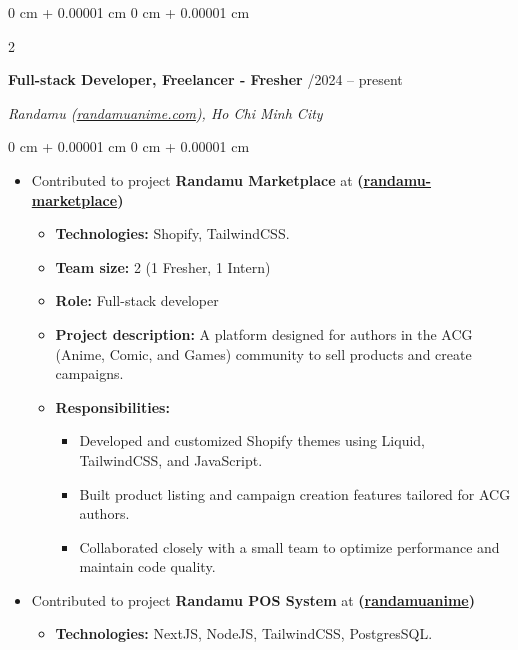 \documentclass[10pt, letterpaper]{article}
\newenvironment{highlights}{
    \begin{itemize}[
        topsep=0.10 cm,
        parsep=0.10 cm,
        partopsep=0pt,
        itemsep=0pt,
        leftmargin=0 cm + 10pt
    ]
}{
    \end{itemize}
} %
\newenvironment{onecolentry}{
    \begin{adjustwidth}{
        0 cm + 0.00001 cm
    }{
        0 cm + 0.00001 cm
    }
}{
    \end{adjustwidth}
} %
\newenvironment{twocolentry}[2][]{
    \onecolentry
    \def\secondColumn{#2}
    \setcolumnwidth{\fill, 4.5 cm}
    \begin{paracol}{2}
}{
    \switchcolumn \raggedleft \secondColumn
    \end{paracol}
    \endonecolentry
} %
\begin{document}
        \begin{twocolentry}{
            11/2024 – present
        }
            \textbf{Full-stack Developer, Freelancer - Fresher}\end{twocolentry}
        \vspace{0.10 cm}
        \par{\textit{Randamu (\href{https://randamuanime.com/en}{randamuanime.com}), Ho Chi Minh City}}
        \vspace{0.10 cm}
        \begin{onecolentry}
            \begin{highlights}
                \item Contributed to project {\bf Randamu Marketplace} at 
                {\bf (\href{https://marketplace.randamu.co/}{randamu-marketplace})}
                \begin{itemize}
                    \item {\bf Technologies:} Shopify, TailwindCSS.
                    \item {\bf Team size:} 2 (1 Fresher, 1 Intern)
                    \item {\bf Role:} Full-stack developer
                    \item {\bf Project description:} A platform designed for authors in the ACG (Anime, Comic, and Games) community to sell products and create campaigns.
                    \item {\bf Responsibilities:}
                    \begin{itemize}
                        \item Developed and customized Shopify themes using Liquid, TailwindCSS, and JavaScript.
                        \item Built product listing and campaign creation features tailored for ACG authors.
                        \item Collaborated closely with a small team to optimize performance and maintain code quality.
                    \end{itemize}
                \end{itemize}
                \item Contributed to project {\bf Randamu POS System} at {\bf (\href{https://randamuanime.com/en}{randamuanime})}
                \begin{itemize}
                    \item {\bf Technologies:} NextJS, NodeJS, TailwindCSS, PostgresSQL.

\end{itemize}
\end{highlights}
\end{onecolentry}
\end{document}
